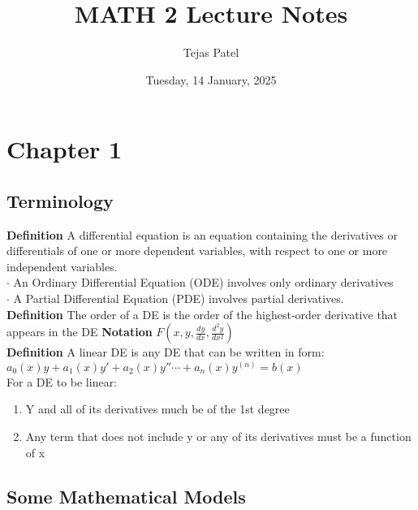 \documentclass{article}
\title{MATH 2 Lecture Notes}
\date{Tuesday, 14 January, 2025}
\author{Tejas Patel}
\begin{document}
\maketitle
\tableofcontents
\pagebreak
\section{Chapter 1}
\subsection{Terminology}
\textbf{Definition} A differential equation is an equation containing the derivatives or differentials 
of one or more dependent variables, with respect to one or more independent variables.\\
\textbf{$\cdot$} An Ordinary Differential Equation (ODE) involves only ordinary derivatives\\
\textbf{$\cdot$} A Partial Differential Equation (PDE) involves partial derivatives.\\
\textbf{Definition} The order of a DE is the order of the highest-order derivative that appears in the DE
\textbf{Notation} $F(x,y,\frac{dy}{dx}, \frac{d^2y}{dx^2})$\\
\textbf{Definition} A linear DE is any DE that can be written in form:\\
${\displaystyle a_{0}(x)y+a_{1}(x)y'+a_{2}(x)y''\cdots +a_{n}(x)y^{(n)}=b(x)}$\\
For a DE to be linear:
\begin{enumerate}
    \item Y and all of its derivatives much be of the 1st degree
    \item Any term that does not include y or any of its derivatives must be a function of x
\end{enumerate}

\subsection{Some Mathematical Models}
\end{document}
